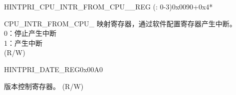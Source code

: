 \begin{register}{H}{INTPRI\_CPU\_INTR\_FROM\_CPU\_\_REG (: 0-3)}{0x0090+0x4*}\label{regdesc:INTPRICPUINTRFROMCPUNREG}
%
%
\regnewline%
\begin{regdesc}\begin{reglist}
\label{fielddesc:INTPRICPUINTRFROMCPUN}\item [INTPRI\_CPU\_INTR\_FROM\_CPU\_\regindex{n}] CPU\_INTR\_FROM\_CPU\_ 映射寄存器，通过软件配置寄存器产生中断。\\
0：停止产生中断\\
1：产生中断\\ (R/W)
\end{reglist}\end{regdesc}
\end{register}


\begin{register}{H}{INTPRI\_DATE\_REG}{0x00A0}\label{regdesc:INTPRIDATEREG}
%
%
\regnewline%
\begin{regdesc}\begin{reglist}
\label{fielddesc:INTPRIDATE}\item [INTPRI\_DATE] 版本控制寄存器。 (R/W)
\end{reglist}\end{regdesc}
\end{register}


